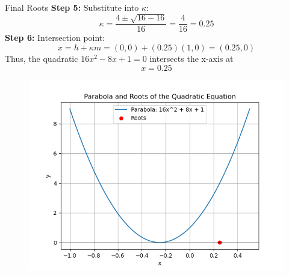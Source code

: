 \documentclass{beamer}
\begin{document}
\begin{frame}{Final Roots}
\textbf{Step 5:} Substitute into $\kappa$:
\[
  \kappa = \frac{4 \pm \sqrt{16-16}}{16} = \frac{4}{16} = 0.25
\]
\textbf{Step 6:} Intersection point:
\[
  x = h + \kappa m = (0,0) + (0.25)(1,0) = (0.25, 0)
\]
Thus, the quadratic $16x^2 - 8x + 1 = 0$ intersects the x-axis at
\[
  \boxed{x = 0.25}
\]
\end{frame}
      \begin{frame}[fragile]
    \begin{figure}[H]
    \centering
    \includegraphics[width = 0.6\columnwidth]{../figs/img.png}
    \caption*{}
    \label{figs}
\end{figure}
\end{frame}
\end{document}
